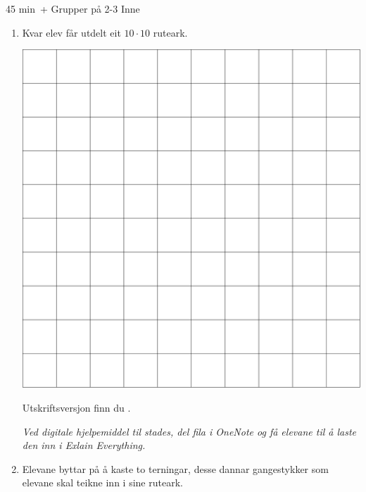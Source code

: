 







{45 min \,+}
{Grupper på 2-3}
{Inne}

\begin{enumerate}
	\item Kvar elev får utdelt eit $ 10\cdot10 $ ruteark. 
	\begin{center}
		\includegraphics[scale=0.075]{gong1}
	\end{center}
 Utskriftsversjon finn du .\vsk
 
\textit{Ved digitale hjelpemiddel til stades, del fila i OneNote og få elevane til å laste den inn i Exlain Everything.}
	\item Elevane byttar på å kaste to terningar, desse dannar gangestykker som elevane skal teikne inn i sine ruteark.\vsk
	

\end{enumerate}
